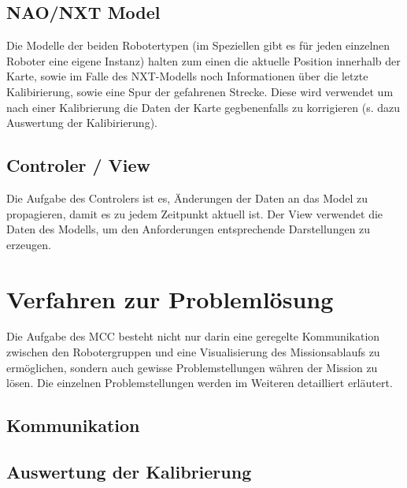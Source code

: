 \subsection{NAO/NXT Model}
Die Modelle der beiden Robotertypen (im Speziellen gibt es für jeden einzelnen Roboter eine eigene Instanz) halten zum einen die aktuelle Position innerhalb der Karte, sowie im Falle des NXT-Modells noch Informationen über die letzte Kalibirierung, sowie eine Spur der gefahrenen Strecke. Diese wird verwendet um nach einer Kalibrierung die Daten der Karte gegbenenfalls zu korrigieren (s. dazu Auswertung der Kalibirierung).

\subsection{Controler / View}
Die Aufgabe des Controlers ist es, Änderungen der Daten an das Model zu propagieren, damit es zu jedem Zeitpunkt aktuell ist. Der View verwendet die Daten des Modells, um den Anforderungen entsprechende Darstellungen zu erzeugen.


\section{Verfahren zur Problemlösung}
Die Aufgabe des MCC besteht nicht nur darin eine geregelte Kommunikation zwischen den Robotergruppen und eine Visualisierung des Missionsablaufs zu ermöglichen, sondern auch gewisse Problemstellungen währen der Mission zu lösen. Die einzelnen Problemstellungen werden im Weiteren detailliert erläutert.

\subsection{Kommunikation}

\subsection{Auswertung der Kalibrierung}

